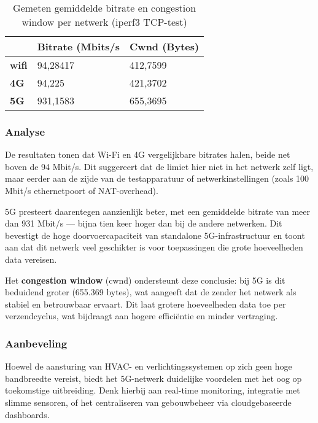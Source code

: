 \begin{table}[]
    \caption{Gemeten gemiddelde bitrate en congestion window per netwerk (iperf3 TCP-test)}
    \begin{tabular}{l l l}
        \cline{2-3}
        & \textbf{Bitrate (Mbits/s} & \textbf{Cwnd (Bytes)} \\ \hline
        \multicolumn{1}{l}{\textbf{wifi}} & 94,28417                    & 412,7599              \\ \hline
        \multicolumn{1}{l}{\textbf{4G}}   & 94,225                      & 421,3702              \\ \hline
        \multicolumn{1}{l}{\textbf{5G}}   & 931,1583                    & 655,3695              \\ \hline
    \end{tabular}
    
    \label{tab:bandbreedte}
\end{table}

\subsubsection{Analyse}
De resultaten tonen dat Wi-Fi en 4G vergelijkbare bitrates halen, beide net boven de 94 Mbit/s. Dit suggereert dat de limiet hier niet in het netwerk zelf ligt, maar eerder aan de zijde van de testapparatuur of netwerkinstellingen (zoals 100 Mbit/s ethernetpoort of NAT-overhead).

5G presteert daarentegen aanzienlijk beter, met een gemiddelde bitrate van meer dan 931 Mbit/s — bijna tien keer hoger dan bij de andere netwerken. Dit bevestigt de hoge doorvoercapaciteit van standalone 5G-infrastructuur en toont aan dat dit netwerk veel geschikter is voor toepassingen die grote hoeveelheden data vereisen.

Het \textbf{congestion window} (cwnd) ondersteunt deze conclusie: bij 5G is dit beduidend groter (655.369 bytes), wat aangeeft dat de zender het netwerk als stabiel en betrouwbaar ervaart. Dit laat grotere hoeveelheden data toe per verzendcyclus, wat bijdraagt aan hogere efficiëntie en minder vertraging.

\subsubsection{Aanbeveling}
Hoewel de aansturing van HVAC- en verlichtingssystemen op zich geen hoge bandbreedte vereist, biedt het 5G-netwerk duidelijke voordelen met het oog op toekomstige uitbreiding. Denk hierbij aan real-time monitoring, integratie met slimme sensoren, of het centraliseren van gebouwbeheer via cloudgebaseerde dashboards.

